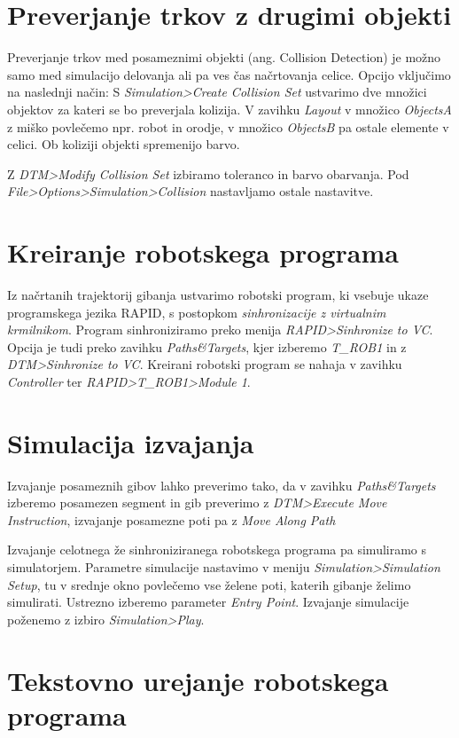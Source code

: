 \clearpage
\section{Preverjanje trkov z drugimi objekti}

Preverjanje trkov med posameznimi objekti (ang. Collision Detection) je možno
samo med simulacijo delovanja ali pa ves čas načrtovanja celice. Opcijo
vključimo na naslednji način: S \emph{Simulation>Create Collision Set}
ustvarimo dve množici objektov za kateri se bo preverjala kolizija. V
zavihku \emph{Layout} v množico \emph{ObjectsA} z miško povlečemo npr.
robot in orodje, v množico \emph{ObjectsB} pa ostale elemente v celici. Ob
koliziji objekti spremenijo barvo.

Z \emph{DTM>Modify Collision Set} izbiramo toleranco in barvo
obarvanja. Pod \emph{File>Options>Simulation>Collision} nastavljamo ostale nastavitve.


\section{Kreiranje robotskega programa}

Iz načrtanih trajektorij gibanja ustvarimo robotski program, ki vsebuje ukaze
programskega jezika RAPID, s postopkom \emph{sinhronizacije z virtualnim
krmilnikom}. Program sinhroniziramo preko menija \emph{RAPID>Sinhronize to
VC}. Opcija je tudi preko zavihku \emph{Paths\&Targets}, kjer izberemo
\emph{T\_ROB1} in z \emph{DTM>Sinhronize to VC}. Kreirani robotski program se
nahaja v zavihku \emph{Controller} ter \emph{RAPID>T\_ROB1>Module 1}.

\section{Simulacija izvajanja}

Izvajanje posameznih gibov lahko preverimo tako, da v zavihku
\emph{Paths\&Targets} izberemo posamezen segment in gib preverimo z
\emph{DTM>Execute Move Instruction}, izvajanje posamezne poti pa z
\emph{Move Along Path}

Izvajanje celotnega že sinhroniziranega robotskega programa pa
simuliramo s simulatorjem. Parametre simulacije nastavimo v meniju
\emph{Simulation>Simulation Setup}, tu v srednje okno povlečemo vse
želene poti, katerih gibanje želimo simulirati. Ustrezno izberemo
parameter \emph{Entry Point}. Izvajanje simulacije poženemo z izbiro
\emph{Simulation>Play}.

\section{Tekstovno urejanje robotskega programa}

